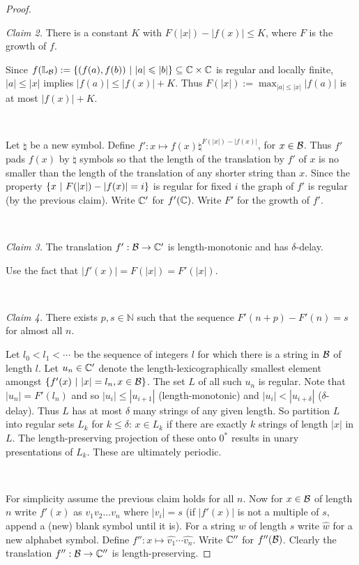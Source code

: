 \begin{proof}
\

\noindent
{\em Claim 2.} There is a constant $K$ with $F(|x|) - |f(x)| \leq K$, where $F$ is the growth of $f$.

Since $f(\mathbb{L}_{\mathcal B}) := \{(f(a),f(b)) \ \vert \  |a| \leqslant |b|\} \subseteq \mathbb{C} \times \mathbb{C}$ is regular and locally finite, $|a| \leq |x|$ implies $|f(a)| \leq |f(x)| + K$. Thus
$F(|x|) := \max_{|a| \leq |x|} |f(a)|$ is at most $|f(x)| + K$.

\

Let $\natural$ be a new symbol. Define $f':x \mapsto f(x) \natural^{F(|x|) - |f(x)|}$, for $x \in {\mathcal B}$. Thus $f'$ pads 
$f(x)$ by $\natural$ symbols so that the length of the translation by $f'$ of $x$ is no smaller than the length of the translation of any shorter string than $x$. 
Since the property $\{x \ \vert \  F(|x|)-|f(x)| = i\}$ is regular for fixed $i$
 the graph of $f'$ is regular (by the previous claim). Write $\mathbb{C}'$ for $f'(\mathbb{C})$. Write $F'$ for the growth of $f'$.

\

\noindent
{\em Claim 3.} The translation $f':{\mathcal B} \to \mathbb{C}'$ is length-monotonic and has $\delta$-delay.

Use the fact that $|f'(x)| = F(|x|) = F'(|x|)$.

\

\noindent
{\em Claim 4.} There exists $p,s \in \mathbb{N}$ such that the sequence  $F'(n+p) - F'(n) = s$ for almost all $n$.

Let $l_0 < l_1 < \cdots$ be the sequence of integers $l$ for which there is a string in ${\mathcal B}$ of length $l$. Let 
$u_n \in \mathbb{C}'$ denote the length-lexicographically smallest element amongst $\{f'(x) \ \vert \  |x| = l_n, x \in {\mathcal B}\}$.
The set $L$ of all such $u_n$ is regular. Note that $|u_n| = F'(l_n)$ and so $|u_i| \leq |u_{i+1}|$ (length-monotonic) and $|u_i| < |u_{i+\delta}|$ ($\delta$-delay).
Thus $L$ has at most $\delta$ many strings of any given length.
So partition $L$ into regular sets $L_k$ for $k \leq \delta$:  $x \in L_k$ if there are exactly $k$ strings of length $|x|$ in $L$. The length-preserving projection of these onto $0^\ast$ results in 
unary presentations of $L_k$. These are ultimately periodic.


\

For simplicity assume the previous claim holds for all $n$. Now for $x \in {\mathcal B}$ of length $n$ write $f'(x) $ as $v_1 v_2 \dots v_n$ where $|v_i| = s$ (if $|f'(x)|$ is not a multiple of $s$, append
a (new) blank symbol until it is). For a string $w$ of length $s$ write $\widehat{w}$ for a new alphabet symbol. 
Define $f'':x \mapsto \widehat{v_1} \cdots \widehat{v_n}$. Write $\mathbb{C}''$ for $f''({\mathcal B})$. Clearly 
the translation $f'':{\mathcal B} \to \mathbb{C}''$ is length-preserving.


\end{proof}
